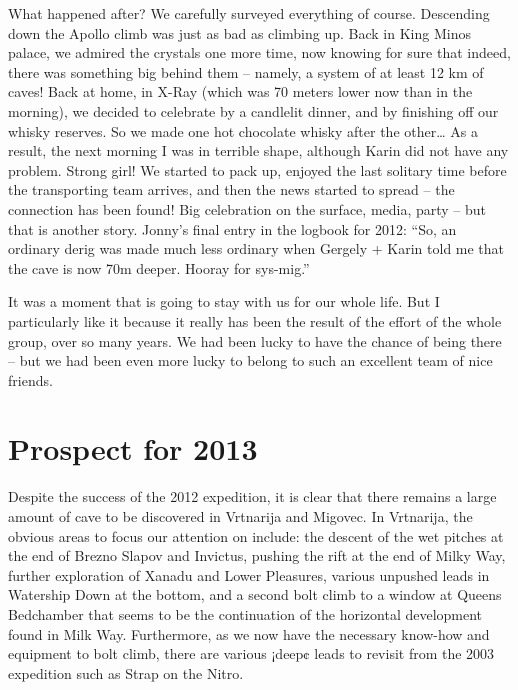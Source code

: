 What happened after? We carefully surveyed everything of course.
Descending down the Apollo climb was just as bad as climbing up. Back in
King Minos palace, we admired the crystals one more time, now knowing
for sure that indeed, there was something big behind them -- namely, a
system of at least 12 km of caves! Back at home, in X-Ray (which was 70
meters lower now than in the morning), we decided to celebrate by a
candlelit dinner, and by finishing off our whisky reserves. So we made
one hot chocolate whisky after the other\ldots{} As a result, the next
morning I was in terrible shape, although Karin did not have any
problem. Strong girl! We started to pack up, enjoyed the last solitary
time before the transporting team arrives, and then the news started to
spread -- the connection has been found! Big celebration on the surface,
media, party -- but that is another story. Jonny's final entry in the
logbook for 2012: ``So, an ordinary derig was made much less ordinary
when Gergely + Karin told me that the cave is now 70m deeper. Hooray for
sys-mig.''

It was a moment that is going to stay with us for our whole life. But I
particularly like it because it really has been the result of the effort
of the whole group, over so many years. We had been lucky to have the
chance of being there -- but we had been even more lucky to belong to
such an excellent team of nice friends.


\hypertarget{prospect-for-2013}{%
\section{Prospect for 2013}\label{prospect-for-2013}}

Despite the success of the 2012 expedition, it is clear that there
remains a large amount of cave to be discovered in Vrtnarija and
Migovec. In Vrtnarija, the obvious areas to focus our attention on
include: the descent of the wet pitches at the end of Brezno Slapov and
Invictus, pushing the rift at the end of Milky Way, further exploration
of Xanadu and Lower Pleasures, various unpushed leads in Watership Down
at the bottom, and a second bolt climb to a window at Queens Bedchamber
that seems to be the continuation of the horizontal development found in
Milk Way. Furthermore, as we now have the necessary know-how and
equipment to bolt climb, there are various ¡deep¢ leads to revisit from
the 2003 expedition such as Strap on the Nitro.

